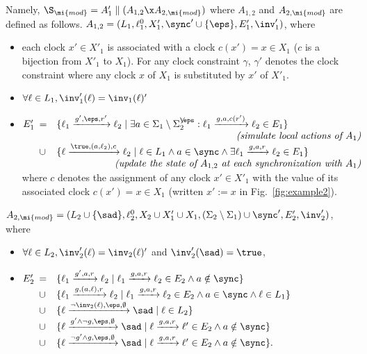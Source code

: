 \documentclass{LMCS}
\theoremstyle{plain}\newtheorem*{prop11}{Proposition~\ref{prop:states} bis}
\begin{document}
Namely, $\S_\mi{mod}=A'_1\parallel (A_{1,2}\x A_{2,\mi{mod}})$
where $A_{1,2}$ and $A_{2,\mi{mod}}$ are defined as follows.
$A_{1,2}=(L_1,\ell_1^{0},X_1',\sync'\cup\{\eps\},E'_1,\inv_1')$, where
\begin{itemize}
  \item each clock $x'\in X'_1$ is associated
  with a clock $c(x')=x\in X_1$ ($c$ is a bijection from $X'_1$ to
  $X_1$).
For any clock constraint $\gamma$, $\gamma'$ denotes the clock constraint where any clock $x$ of $X_1$
  is substituted by $x'$ of $X'_1$.
  \item $\forall \ell\in L_1, \inv_1'(\ell)=\inv_1(\ell)'$
  \item $E'_1
  \begin{array}[t]{ll}
    =&\{\ell_1\xrightarrow{g',\eps,r'}\ell_2\mid
    \exists a\in\Sigma_1\setminus\Sigma_{2}^{\not\eps}:
    \ell_1\xrightarrow{g,a,c(r')}\ell_2\in E_1\}
    \\&\hfill
    \mbox{\it(simulate local actions of $A_1$)}\\
    \cup&\{\ell\xrightarrow{\true,(a,\ell_2),c}\ell_2\mid
    \ell \in L_1 \land
    a \in\sync \land
    \exists\ell_1\xrightarrow{g,a,r}\ell_2\in E_1\}
    \\& \qquad\qquad\qquad\hfill
    \mbox{\it(update the state of $A_{1,2}$ at each synchronization
      with $A_1$)}
  \end{array}$\\ where $c$ denotes the assignment of any clock $x'\in X'_1$
  with the value of its associated clock $c(x')=x\in X_1$ (written $x':=x$
  in Fig.~\ref{fig:example2}).
\end{itemize}
$A_{2,\mi{mod}}=(L_2\cup\{\sad\},\ell_2^{0},X_2\cup X'_1\cup X_1,
(\Sigma_2\setminus\Sigma_1)\cup\sync',E_2',\inv_2')$, where
\begin{itemize}
\item $\forall\ell\in L_2,\inv_2'(\ell)=\inv_2(\ell)'$ and $\inv_2'(\sad)=\true$,
  \item $E'_2\begin{array}[t]{ll}
  =&\{\ell_1\xrightarrow{g',a,r}\ell_2
  \mid\ell_1\xrightarrow{g,a,r}\ell_2\in E_2 \land a\notin\sync\}
  \\
  \cup&\{\ell_1\xrightarrow{g,(a,\ell),r}\ell_2
  \mid\ell_1\xrightarrow{g,a,r}\ell_2\in E_2\land a \in\sync \land \ell \in L_1\}
  \\
  \cup&\{\ell\xrightarrow{\neg\inv_2(\ell),\eps,\emptyset}\sad
  \mid\ell\in L_2\}
  \\
  \cup&\{\ell\xrightarrow{g'\land\neg g,\eps,\emptyset}\sad
  \mid\ell\xrightarrow{g,a,r}\ell'\in E_2 \land a\notin\sync\}
  \\
  \cup&\{\ell\xrightarrow{\neg g'\land g,\eps,\emptyset}\sad
  \mid\ell\xrightarrow{g,a,r}\ell'\in E_2 \land a\notin\sync\}.
  \end{array}$
\end{itemize} 
\end{document}
